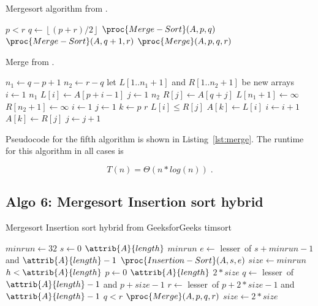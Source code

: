 \documentclass[twocolumn, sigconf, nonacm, natbib, screen, balance=False]{acmart}
\begin{document}
\begin{listing}[H]
  \caption{Mergesort algorithm from \citet[Ch.~2.1]{CLRS_2009}.}
  \label{lst:mergesort_algo}
  \begin{codebox}
	\li \If $p < r$
	\li \Then $q \gets \left\lfloor(p + r) / 2\right\rfloor$
	\li 	$\proc{Merge-Sort}(A, p, q)$
	\li 	$\proc{Merge-Sort}(A, q+1, r)$
	\li 	$\proc{Merge}(A, p, q, r)$
	\End
  \end{codebox}
\end{listing}

\begin{listing}[H]
  \caption{Merge from \citet[Ch.~2.1]{CLRS_2009}.}
  \label{lst:merge}
  \begin{codebox}
	\li $n_1 \gets q-p+1$
	\li $n_2 \gets r-q$
	\li let $L[1..n_1+1]$ and $R[1..n_2+1]$ be new arrays
	\li \For $i \gets 1$ \To $n_1$
	\li \Do $L[i] \gets A[p+i-1]$
	\End
	\li \For $j \gets 1$ \To $n_2$
	\li \Do $R[j] \gets A[q+j]$
	\End
	\li $L[n_1+1] \gets \infty$
	\li $R[n_2+1] \gets \infty$
	\li $i \gets 1$
	\li $j \gets 1$
	\li \For $k \gets p$ \To $r$
	\li \Do \If $L[i] \le R[j]$
	\li 	\Then $A[k] \gets L[i]$
	\li 		$i \gets i+1$
	\li 	\Else $A[k] \gets R[j]$
	\li 	$j \gets j+1$
	\End
	\End
  \end{codebox}
\end{listing}

Pseudocode for the fifth algorithm is shown in
Listing~\ref{lst:merge}. The runtime for this algorithm in all cases is

\begin{equation}
  T(n) = \Theta(n*log(n)) \;.  \label{eq:ins_sort_best}
\end{equation}

\subsection{Algo 6: Mergesort Insertion sort hybrid}\label{sec:algo7}

\begin{listing}
  \caption{Mergesort Insertion sort hybrid from GeeksforGeeks timsort}
  \label{lst:mergeinsert_algo}
  \begin{codebox}
    \li $minrun \gets 32$
    \li \For $s \gets 0$ \To $\attrib{A}{length}$ \By $minrun$
    \li \Do $e \gets$ lesser~of $s+minrun-1$ and $\attrib{A}{length}-1$
    \li		$\proc{Insertion-Sort}(A, s, e)$
    \End
    \li $size \gets minrun$
    \li \While $h<\attrib{A}{length}$
    \li \Do \For $p \gets 0$ \To $\attrib{A}{length}$ \By $2*size$
    \li 	\Do $q \gets$ lesser~of $\attrib{A}{length}-1$ and $p+size-1$
    \li			$r \gets$ lesser~of $p+2*size-1$ and $\attrib{A}{length}-1$
    \li			\If $q<r$
    \li 		\Do $\proc{Merge}(A, p, q, r)$
    \End
    \End
    \li 	$size \gets 2*size$
    \End		
  \end{codebox}
\end{listing}
\end{document}
